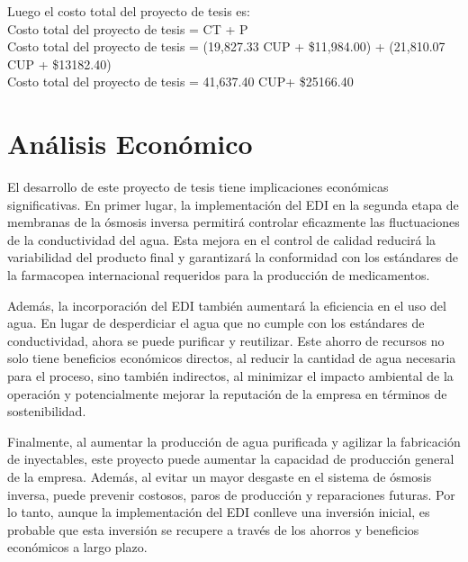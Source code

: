 Luego el costo total del proyecto de tesis es:\\
Costo total del proyecto de tesis = CT + P                                                   \\
Costo total del proyecto de tesis = (19,827.33 CUP + \$11,984.00) + (21,810.07 CUP + \$13182.40) \\
Costo total del proyecto de tesis = 41,637.40 CUP+ \$25166.40

\section{Análisis Económico}
El desarrollo de este proyecto de tesis tiene implicaciones económicas significativas. En primer lugar, la implementación del EDI en la segunda etapa de membranas de la ósmosis inversa permitirá controlar eficazmente las fluctuaciones de la conductividad del agua. Esta mejora en el control de calidad reducirá la variabilidad del producto final y garantizará la conformidad con los estándares de la farmacopea internacional requeridos para la producción de medicamentos.

Además, la incorporación del EDI también aumentará la eficiencia en el uso del agua. En lugar de desperdiciar el agua que no cumple con los estándares de conductividad, ahora se puede purificar y reutilizar. Este ahorro de recursos no solo tiene beneficios económicos directos, al reducir la cantidad de agua necesaria para el proceso, sino también indirectos, al minimizar el impacto ambiental de la operación y potencialmente mejorar la reputación de la empresa en términos de sostenibilidad.

Finalmente, al aumentar la producción de agua purificada y agilizar la fabricación de inyectables, este proyecto puede aumentar la capacidad de producción general de la empresa. Además, al evitar un mayor desgaste en el sistema de ósmosis inversa, puede prevenir costosos, paros de producción y reparaciones futuras. Por lo tanto, aunque la implementación del EDI conlleve una inversión inicial, es probable que esta inversión se recupere a través de los ahorros y beneficios económicos a largo plazo.








